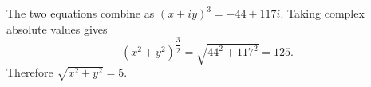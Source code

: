 The two equations combine as $(x+iy)^3=-44+117i$. Taking complex absolute values gives
\[
(x^2+y^2)^{\dfrac{3}{2}}=\sqrt{44^2+117^2}=125.
\]
Therefore $\boxed{\sqrt{x^2+y^2}=5}$.
